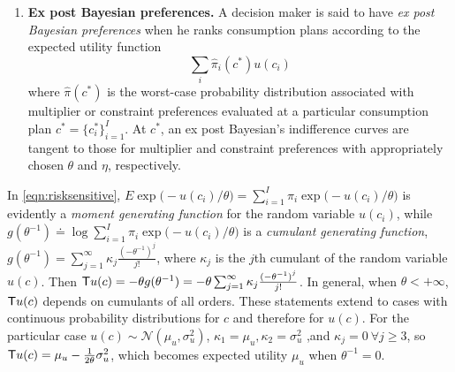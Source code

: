 \begin{enumerate}
\item\textbf{Ex post Bayesian preferences.} A decision maker is said to have {\em ex post Bayesian preferences}
when he ranks consumption plans according to
the expected utility function
\[ \sum_i \hat \pi_i (c^*) u(c_i) \]
where  $\hat \pi(c^*)$ is the   worst-case probability distribution associated with multiplier or constraint preferences
evaluated at a particular consumption plan $c^* = \{c_i^*\}_{i=1}^I$.
 At
 $c^*$, an ex post Bayesian's indifference curves are  tangent to those for  multiplier and constraint preferences with appropriately chosen
$\theta$ and $\eta$, respectively.



 \end{enumerate}



\begin{remark}\label{rem:moment_generate}
In \eqref{eqn:risksensitive}, %
 $E \exp\bigl(-u(c_i)/\theta\bigr) = \sum_{i=1}^I \pi_i \exp\bigl(- u(c_i)/\theta  \bigr) $ is evidently
a {\em moment generating function} for the random variable $u(c_i)$, while $ g(\theta^{-1}) \doteq  \log \sum_{i=1}^I \pi_i \exp\bigl(- u(c_i)/\theta  \bigr)$ is a {\em cumulant generating function},
$g(\theta^{-1}) = \sum_{j=1}^\infty \kappa_j \frac{{(-\theta^{-1})}^{j}}{j!}$, where $\kappa_j$ is the $j$th cumulant of the random variable $u(c)$.  Then
${\sf T}u(c) = -\theta g(\theta^{-1}) = -\theta \sum_{j=1}^\infty \kappa_j \frac{{(-\theta^{-1})}^{j}}{j!}$. In general, when $\theta < +\infty$, ${\sf T} u(c)$ depends on cumulants of all orders.  These statements extend to cases with  continuous probability distributions for $c$ and therefore for $u(c)$.
For the particular  case  $u(c) \sim {\mathcal N}(\mu_u, \sigma_u^2)$,
$\kappa_1 = \mu_u, \kappa_2 = \sigma_u^2$ ,and $\kappa_j = 0 \ \forall j \geq 3$, so
${\sf T} u(c) = \mu_u - \frac{1}{2 \theta} \sigma_u^2$, which becomes expected utility $\mu_u$ when $\theta^{-1} = 0$.
\end{remark}

%
%
%
%
%




